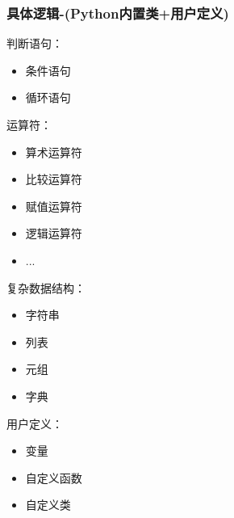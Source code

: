 \documentclass[11pt]{beamer}
\begin{document}
\begin{frame}[fragile]
	\frametitle{具体逻辑-(Python内置类+用户定义)}
	\begin{minipage}[t]{0.25\linewidth}
		判断语句：
		\begin{itemize}
			\item 条件语句
			\item 循环语句
		\end{itemize}
	\end{minipage}%
	\begin{minipage}[t]{0.25\linewidth}
		运算符：
		\begin{itemize}
			\item 算术运算符
			\item  比较运算符
			\item 赋值运算符
			\item 逻辑运算符
			\item ...
		\end{itemize}
	\end{minipage}%
	\begin{minipage}[t]{0.25\linewidth}
		复杂数据结构：
		\begin{itemize}
			\item 字符串
			\item 列表
			\item 元组
			\item 字典
		\end{itemize}
	\end{minipage}%
	\begin{minipage}[t]{0.25\linewidth}
		用户定义：
		\begin{itemize}
			\item 变量
			\item 自定义函数
			\item 自定义类
		\end{itemize}
	\end{minipage}
\end{frame}
\end{document}
